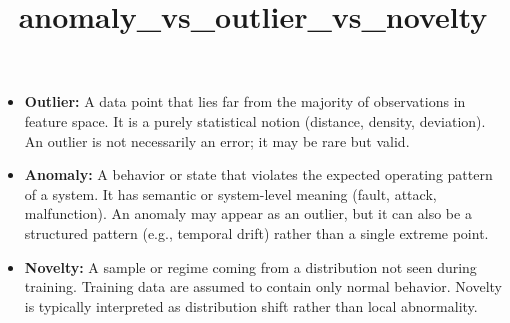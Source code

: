 \documentclass[a4paper]{article}
\title{anomaly\_vs\_outlier\_vs\_novelty}
\date{}
\begin{document}
    \maketitle
    \begin{itemize}
        \item \textbf{Outlier:}
        A data point that lies far from the majority of observations in feature space.
        It is a purely statistical notion (distance, density, deviation).
        An outlier is not necessarily an error; it may be rare but valid.
        
        \item \textbf{Anomaly:}
        A behavior or state that violates the expected operating pattern of a system.
        It has semantic or system-level meaning (fault, attack, malfunction).
        An anomaly may appear as an outlier, but it can also be a structured pattern (e.g., temporal drift) rather than a single extreme point.
        
        \item \textbf{Novelty:}
        A sample or regime coming from a distribution not seen during training.
        Training data are assumed to contain only normal behavior.
        Novelty is typically interpreted as distribution shift rather than local abnormality.
    \end{itemize}
    
\end{document}
